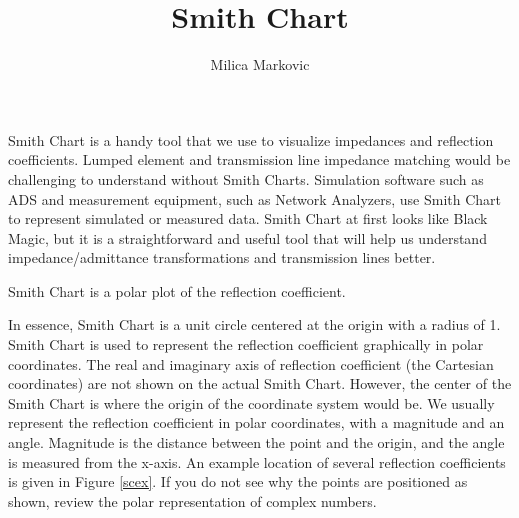 \documentclass{ximera}
\title{Smith Chart}
\author{Milica Markovic}
\begin{document}
  
\begin{abstract}  

\end{abstract}  
\maketitle    







Smith Chart is a handy tool that we use to visualize impedances and reflection coefficients. Lumped element and transmission line impedance matching would be challenging to understand without Smith Charts. Simulation software such as ADS and measurement equipment, such as Network Analyzers, use Smith Chart to represent simulated or measured data.   Smith Chart at first looks like Black Magic, but it is a straightforward and useful tool that will help us understand impedance/admittance transformations and transmission lines better. 

\begin{definition}
Smith Chart is a polar plot of the reflection coefficient.
\end{definition}

In essence, Smith Chart is a unit circle centered at the origin with a radius of 1. Smith Chart is used to represent the reflection coefficient graphically in polar coordinates. The real and imaginary axis of reflection coefficient (the Cartesian coordinates) are not shown on the actual Smith Chart. However, the center of the Smith Chart is where the origin of the coordinate system would be. We usually represent the reflection coefficient in polar coordinates, with a
magnitude and an angle. Magnitude is the distance between the point and the origin, and the angle is measured from the x-axis. 
 An example location of several reflection coefficients is given in Figure \ref{scex}. If you do not see why the points are positioned as shown, review the polar representation of complex numbers.
\end{document}
